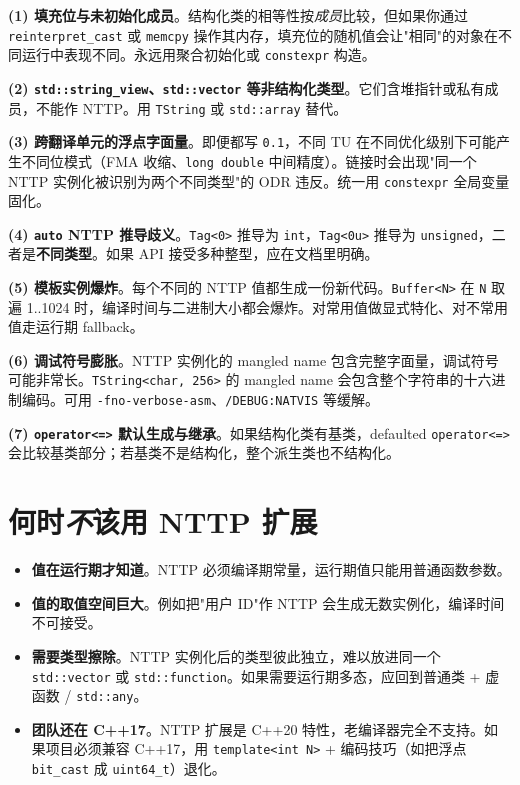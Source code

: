 \documentclass[12pt,a4paper,fontset=fandol]{ctexbook}
\newcommand{\cpp}[1]{C++#1}
\newcommand{\kw}[1]{\texttt{#1}}
\begin{document}
\begin{warning}
\textbf{(1) 填充位与未初始化成员}。结构化类的相等性按\emph{成员}比较，但如果你通过 \kw{reinterpret\_cast} 或 \kw{memcpy} 操作其内存，填充位的随机值会让"相同"的对象在不同运行中表现不同。永远用聚合初始化或 \kw{constexpr} 构造。

\textbf{(2) \kw{std::string\_view}、\kw{std::vector} 等非结构化类型}。它们含堆指针或私有成员，不能作 NTTP。用 \kw{TString} 或 \kw{std::array} 替代。

\textbf{(3) 跨翻译单元的浮点字面量}。即便都写 \kw{0.1}，不同 TU 在不同优化级别下可能产生不同位模式（FMA 收缩、\kw{long double} 中间精度）。链接时会出现"同一个 NTTP 实例化被识别为两个不同类型"的 ODR 违反。统一用 \kw{constexpr} 全局变量固化。

\textbf{(4) \kw{auto} NTTP 推导歧义}。\kw{Tag<0>} 推导为 \kw{int}，\kw{Tag<0u>} 推导为 \kw{unsigned}，二者是\textbf{不同类型}。如果 API 接受多种整型，应在文档里明确。

\textbf{(5) 模板实例爆炸}。每个不同的 NTTP 值都生成一份新代码。\kw{Buffer<N>} 在 \kw{N} 取遍 1..1024 时，编译时间与二进制大小都会爆炸。对常用值做显式特化、对不常用值走运行期 fallback。

\textbf{(6) 调试符号膨胀}。NTTP 实例化的 mangled name 包含完整字面量，调试符号可能非常长。\kw{TString<char, 256>} 的 mangled name 会包含整个字符串的十六进制编码。可用 \kw{-fno-verbose-asm}、\kw{/DEBUG:NATVIS} 等缓解。

\textbf{(7) \kw{operator<=>} 默认生成与继承}。如果结构化类有基类，defaulted \kw{operator<=>} 会比较基类部分；若基类不是结构化，整个派生类也不结构化。
\end{warning}

\section{何时\emph{不}该用 NTTP 扩展}

\begin{itemize}
  \item \textbf{值在运行期才知道}。NTTP 必须编译期常量，运行期值只能用普通函数参数。
  \item \textbf{值的取值空间巨大}。例如把"用户 ID"作 NTTP 会生成无数实例化，编译时间不可接受。
  \item \textbf{需要类型擦除}。NTTP 实例化后的类型彼此独立，难以放进同一个 \kw{std::vector} 或 \kw{std::function}。如果需要运行期多态，应回到普通类 + 虚函数 / \kw{std::any}。
  \item \textbf{团队还在 \cpp{17}}。NTTP 扩展是 \cpp{20} 特性，老编译器完全不支持。如果项目必须兼容 \cpp{17}，用 \kw{template<int N>} + 编码技巧（如把浮点 \kw{bit\_cast} 成 \kw{uint64\_t}）退化。
\end{itemize}
\end{document}
